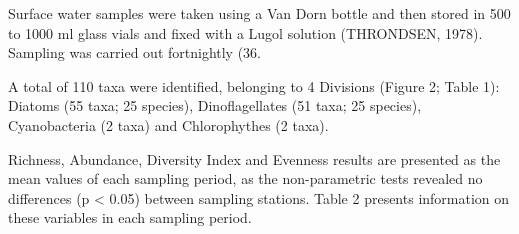 \begin{multicols}{2}
\lipsum



\par{}Surface water samples were taken using a Van
Dorn bottle and then stored in 500 to 1000 ml glass
vials and fixed with a Lugol solution (THRONDSEN,
1978). Sampling was carried out fortnightly (36.

\lipsum
{}


\par{}A total of 110 taxa were identified, belonging to
4 Divisions (Figure 2; Table 1): Diatoms (55 taxa;
25 species), Dinoflagellates (51 taxa; 25 species),
Cyanobacteria (2 taxa) and Chlorophythes (2 taxa).
\par{}Richness, Abundance, Diversity Index and Evenness
results are presented as the mean values of each sampling
period, as the non-parametric tests revealed no differences
(p < 0.05) between sampling stations. Table 2 presents
information on these variables in each sampling period.


\lipsum



\lipsum


\lipsum
\lipsum


\lipsum
\lipsum
\lipsum[1]

\begin{scieloReferencesContainer}[REFERENCES]





\end{scieloReferencesContainer}
\end{multicols}
